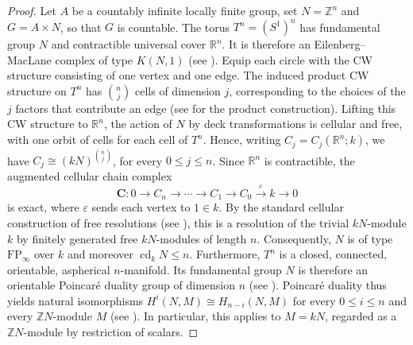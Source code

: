 \documentclass[12pt]{amsart}
\theoremstyle{remark}
\theoremstyle{definition}
\theoremstyle{plain}
\begin{document}
\begin{proof}
Let $A$ be a countably infinite locally finite group, set $N=\mathbb Z^n$ and $G=A\times N$, so that $G$ is countable. The torus $T^n=(S^1)^n$ has fundamental group $N$ and
contractible universal cover $\mathbb R^n$. It is therefore
an Eilenberg--MacLane complex of type $K(N,1)$
(see \cite[Example~1B.5]{Hatcher2002}). Equip each circle with the CW structure consisting of one vertex and one edge. The induced product CW structure on $T^n$ has $\binom{n}{j}$ cells of dimension $j$, corresponding to the choices of the $j$ factors that contribute an edge (see \cite[p.~8]{Hatcher2002} for the product construction). Lifting this CW structure to $\mathbb R^n$, the action of $N$ by deck transformations is cellular and free, with one orbit of cells for each cell of $T^n$. Hence, writing $C_j=C_j(\mathbb R^n;k)$, we have $C_j\cong (kN)^{\binom{n}{j}}$, for every $0\leq j\leq n$. Since $\mathbb R^n$ is contractible, the augmented cellular
chain complex
\[
\mathbf C:
0\rightarrow C_n
\rightarrow\cdots
\rightarrow C_1
\rightarrow C_0
\xrightarrow{\varepsilon} k
\rightarrow 0
\]
is exact, where $\varepsilon$ sends each vertex to $1\in k$.
By the standard cellular construction of free resolutions
(see \cite[Chapter~I, \S4]{Brown}), this is a resolution of the
trivial $kN$-module $k$ by finitely generated free $kN$-modules
of length $n$. Consequently, $N$ is of type
$\mathrm{FP}_{\infty}$ over $k$ and moreover
$\operatorname{cd}_k N\leq n$. Furthermore, $T^n$ is a closed, connected, orientable,
aspherical $n$-manifold. Its fundamental group $N$ is
therefore an orientable Poincar\'e duality group of
dimension $n$ (see \cite[Chapter~VIII, \S10, Example~1]{Brown}).
Poincar\'e duality thus yields natural isomorphisms
$H^i(N,M)\cong H_{n-i}(N,M)$ for every $0\leq i\leq n$
and every $\mathbb ZN$-module $M$ (see \cite[Chapter~VIII, Theorem~10.1 and p.~222]{Brown}).
In particular, this applies to $M=kN$, regarded as a
$\mathbb ZN$-module by restriction of scalars.


\end{proof}
\end{document}
